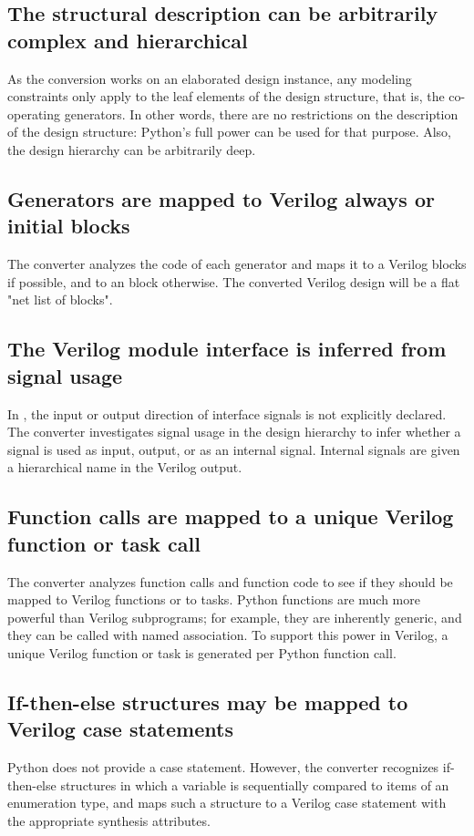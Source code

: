\subsection{The structural description can be arbitrarily complex and hierarchical\label{conv-features-struc}}
As the conversion works on an elaborated design instance, any modeling
constraints only apply to the leaf elements of the design structure,
that is, the co-operating generators. In other words, there are no
restrictions on the description of the design structure: Python's full
power can be used for that purpose. Also, the design hierarchy can be
arbitrarily deep.

\subsection{Generators are mapped to Verilog always or initial blocks\label{conv-features-gen}}
The converter analyzes the code of each generator and maps it
to a Verilog  blocks if possible, and to 
an  block otherwise.
The converted Verilog design will be a flat
"net list of blocks".

\subsection{The Verilog module interface is inferred from signal usage\label{conv-features-intf}}
In \myhdl{}, the input or output direction of interface signals
is not explicitly declared. The converter investigates signal usage
in the design hierarchy to infer whether a signal is used as
input, output, or as an internal signal. Internal signals are
given a hierarchical name in the Verilog output.

\subsection{Function calls are mapped to a unique Verilog function or task call\label{conv-features-func}}
The converter analyzes function calls and function code to see if they
should be mapped to Verilog functions or to tasks. Python functions
are much more powerful than Verilog subprograms; for example, they are
inherently generic, and they can be called with named association.  To
support this power in Verilog, a unique Verilog function or task is
generated per Python function call.

\subsection{If-then-else structures may be mapped to Verilog case statements\label{conv-features-if}}
Python does not provide a case statement. However, 
the converter recognizes if-then-else structures in which a variable is
sequentially compared to items of an enumeration type, and maps
such a structure to a Verilog case statement with the appropriate
synthesis attributes.

